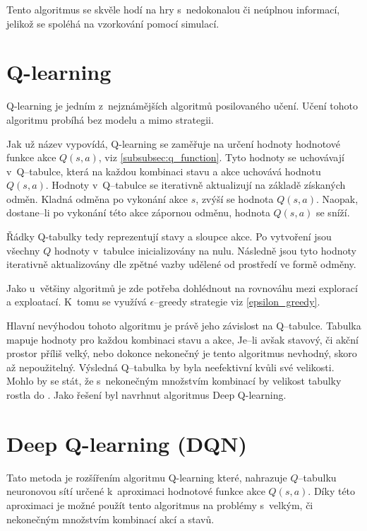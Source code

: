 Tento algoritmus se skvěle hodí na hry s~nedokonalou či neúplnou informací, jelikož se spoléhá na vzorkování pomocí simulací.

\section{Q-learning}\label{subsec:q-learning}

Q-learning je jedním z~nejznámějších algoritmů posilovaného učení.
Učení tohoto algoritmu probíhá bez modelu a mimo strategii.

Jak už název vypovídá, Q-learning se zaměřuje na určení hodnoty hodnotové funkce akce $Q(s, a)$, viz \ref{subsubsec:q_function}.
Tyto hodnoty se uchovávají v~Q--tabulce, která na každou kombinaci stavu a akce uchovává hodnotu $Q(s, a)$.
Hodnoty v~Q--tabulce se iterativně aktualizují na základě získaných odměn.
Kladná odměna po vykonání akce $s$, zvýší se hodnota $Q(s, a)$.
Naopak, dostane--li po vykonání této akce zápornou odměnu, hodnota $Q(s, a)$ se sníží.

Řádky Q-tabulky tedy reprezentují stavy a sloupce akce.
Po vytvoření jsou všechny $Q$ hodnoty v~tabulce inicializovány na nulu.
Následně jsou tyto hodnoty iterativně aktualizovány dle zpětné vazby udělené od prostředí ve formě odměny.

Jako u~většiny algoritmů je zde potřeba dohlédnout na rovnováhu mezi explorací a exploatací.
K~tomu se využívá $\epsilon$--greedy strategie viz \ref{epsilon_greedy}.

Hlavní nevýhodou tohoto algoritmu je právě jeho závislost na Q--tabulce.
Tabulka mapuje hodnoty pro každou kombinaci stavu a akce,
Je--li avšak stavový, či akční prostor příliš velký, nebo dokonce nekonečný je tento algoritmus nevhodný, skoro až nepoužitelný.
Výsledná Q--tabulka by byla neefektivní kvůli své velikosti.
Mohlo by se stát, že s~nekonečným množstvím kombinací by velikost tabulky rostla do .
Jako řešení byl navrhnut algoritmus Deep Q-learning.

\section{Deep Q-learning (DQN)}\label{subsec:deep-q-learning}

Tato metoda je rozšířením algoritmu Q-learning které,
nahrazuje $Q$--tabulku neuronovou sítí určené k~aproximaci hodnotové funkce akce $Q(s, a)$.
Díky této aproximaci je možné použít tento algoritmus na problémy s~velkým, či nekonečným množstvím kombinací akcí a stavů.

